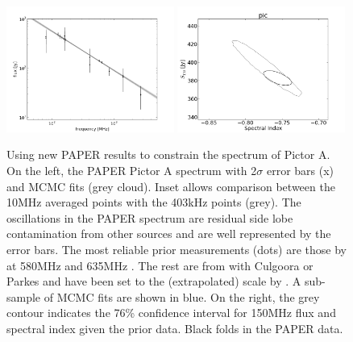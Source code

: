 \documentclass[preprint]{aastex}
\begin{document}
\begin{figure}[htbp]
\includegraphics[width=0.49\textwidth]{plots/pictor_spectrum.png}
\includegraphics[width=0.49\textwidth]{plots/pic_SI_MCMC.png}
\caption{Using new PAPER results to constrain the spectrum of Pictor A.
On the left, the PAPER Pictor A spectrum with 2$\sigma$ error bars (x) and  MCMC fits (grey cloud). Inset allows comparison between the 10MHz averaged points with the 403kHz points (grey). The oscillations in the PAPER spectrum are residual side lobe contamination from other sources and are well represented by the error bars.  The most reliable prior measurements (dots) are those by \cite{Wills:1975p9314} at 580MHz and 635MHz \citep{Perley:1997p9312}. The rest are from with Culgoora \cite{Slee:1995p7541} or Parkes  \cite{Otrupcek:1991p8780} and have been set to the (extrapolated) \citet{Baars:1977p9678} scale by  \cite{Kuehr:1981p9628}. A sub-sample of MCMC fits are shown in blue. On the right, the grey contour indicates the 76\% confidence interval for 150MHz flux and spectral index given the prior data. Black folds in the PAPER data. }
\label{fig:pic_spectrum}
\end{figure}

%
%
\end{document}
